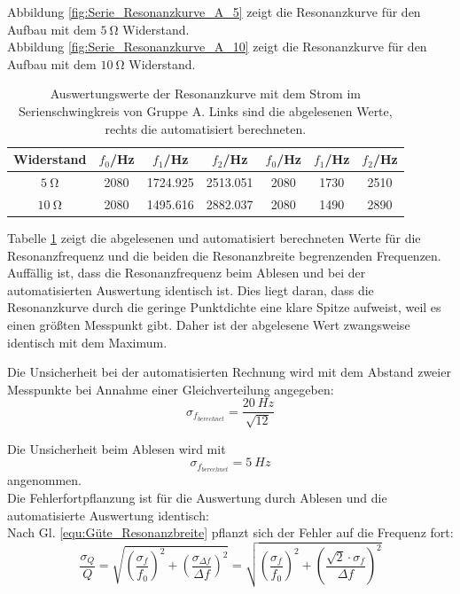 \documentclass[12pt,a4paper]{article}
\begin{document}
Abbildung \ref{fig:Serie_Resonanzkurve_A_5} zeigt die Resonanzkurve für den Aufbau mit dem $\SI{5}{\ohm}$ Widerstand. \\
Abbildung \ref{fig:Serie_Resonanzkurve_A_10} zeigt die Resonanzkurve für den Aufbau mit dem $\SI{10}{\ohm}$ Widerstand.

\begin{table}
\centering
\begin{tabular}{|c|c|c|c||c|c|c|}
\hline
Widerstand & $f_0$/Hz & $f_1$/Hz & $f_2$/Hz & $f_0$/Hz & $f_1$/Hz & $f_2$/Hz \\
\hline
$\SI{5}{\ohm}$ & 2080 & 1724.925 & 2513.051 & 2080 & 1730 & 2510 \\
\hline
$\SI{10}{\ohm}$ & 2080 & 1495.616 & 2882.037 & 2080 & 1490 & 2890 \\
\hline
\end{tabular}
\caption{Auswertungswerte der Resonanzkurve mit dem Strom im Serienschwingkreis von Gruppe A. Links sind die abgelesenen Werte, rechts die automatisiert berechneten.}
\label{tab:StromResonanz_A}
\end{table}

Tabelle \ref{tab:StromResonanz_A} zeigt die abgelesenen und automatisiert berechneten Werte für die Resonanzfrequenz und die beiden die Resonanzbreite begrenzenden Frequenzen. Auffällig ist, dass die Resonanzfrequenz beim Ablesen und bei der automatisierten Auswertung identisch ist. Dies liegt daran, dass die Resonanzkurve durch die geringe Punktdichte eine klare Spitze aufweist, weil es einen größten Messpunkt gibt. Daher ist der abgelesene Wert zwangsweise identisch mit dem Maximum.

Die Unsicherheit bei der automatisierten Rechnung wird mit dem Abstand zweier Messpunkte bei Annahme einer Gleichverteilung angegeben:
\begin{equation*}
\sigma_{f_{berechnet}} = \dfrac{\SI{20}{Hz}}{\sqrt{12}}
\end{equation*}

Die Unsicherheit beim Ablesen wird mit 
\begin{equation*}
\sigma_{f_{berechnet}} = \SI{5}{Hz}
\end{equation*}
angenommen.\\
Die Fehlerfortpflanzung ist für die Auswertung durch Ablesen und die automatisierte Auswertung identisch:\\
Nach Gl. \ref{equ:Güte_Resonanzbreite} pflanzt sich der Fehler auf die Frequenz fort:
\begin{equation}
\dfrac{\sigma_Q}{Q} = \sqrt{\left( \dfrac{\sigma_f}{f_0} \right)^2 + \left( \dfrac{\sigma_{\Delta f}}{\Delta f} \right)^2} = \sqrt{\left( \dfrac{\sigma_f}{f_0} \right)^2 + \left( \dfrac{\sqrt{2} \cdot \sigma _f}{\Delta f} \right)^2}
\label{equ:FehlerGüte_FehlerFrequenz}
\end{equation}
\end{document}
